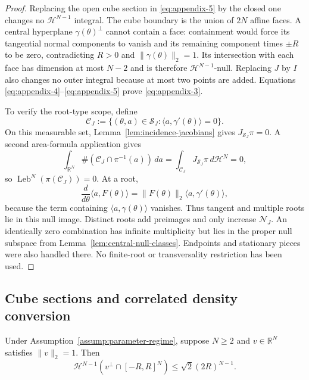 \begin{proof}
Replacing the open cube section in \eqref{eq:appendix-5} by the closed one changes no
$\mathcal H^{N-1}$ integral.  The cube boundary is the union of $2N$ affine
faces.  A central hyperplane $\gamma(\theta)^\perp$ cannot contain a face:
containment would force its tangential normal components to vanish and its
remaining component times $\pm R$ to be zero, contradicting $R>0$ and
$\|\gamma(\theta)\|_2=1$.  Its intersection with each face has dimension at
most $N-2$ and is therefore $\mathcal H^{N-1}$-null.  Replacing $J$ by $I$
also changes no outer integral because at most two points are added.  Equations
\eqref{eq:appendix-4}--\eqref{eq:appendix-5} prove \eqref{eq:appendix-3}.

To verify the root-type scope, define
\[
\mathcal C_J:=\{(\theta,a)\in\mathcal S_J:
 \langle a,\gamma'(\theta)\rangle=0\}.
\]
On this measurable set, Lemma~\ref{lem:incidence-jacobians} gives
$J_{\mathcal S_J}\pi=0$.  A second area-formula application gives
\[
\int_{\mathbb R^N}
 \#(\mathcal C_J\cap\pi^{-1}(a))\,da
=\int_{\mathcal C_J}J_{\mathcal S_J}\pi\,d\mathcal H^N=0,
\]
so $\operatorname{Leb}^N(\pi(\mathcal C_J))=0$.  At a root,
\[
\frac d{d\theta}\langle a,F(\theta)\rangle
=\|F(\theta)\|_2\langle a,\gamma'(\theta)\rangle,
\]
because the term containing $\langle a,\gamma(\theta)\rangle$ vanishes.
Thus tangent and multiple roots lie in this null image.  Distinct roots add
preimages and only increase $\mathcal N_J$.  An identically zero combination
has infinite multiplicity but lies in the proper null subspace from
Lemma~\ref{lem:central-null-classes}.  Endpoints and stationary pieces were
also handled there.  No finite-root or transversality restriction has been
used.
\end{proof}

\subsection{Cube sections and correlated density conversion}
\label{app:cube-density}

\begin{lemma}
\label{lem:scaled-cube-section}
Under Assumption~\ref{assump:parameter-regime}, suppose $N\geq2$ and
$v\in\mathbb R^N$ satisfies $\|v\|_2=1$.  Then
\begin{equation}
\mathcal H^{N-1}(v^\perp\cap[-R,R]^N)
\leq\sqrt2(2R)^{N-1}.
\label{eq:appendix-6}
\end{equation}
\end{lemma}

